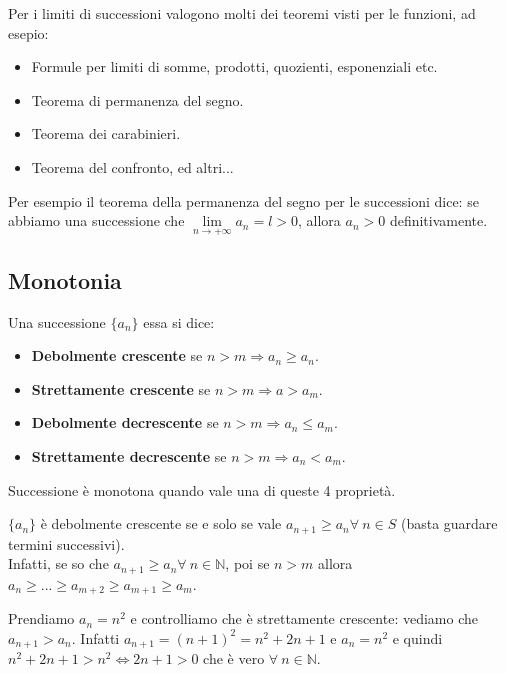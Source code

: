\begin{observation}
Per i limiti di successioni valogono molti dei teoremi visti per le funzioni, ad esepio:
\begin{itemize}
    \item Formule per limiti di somme, prodotti, quozienti, esponenziali etc.
    \item Teorema di permanenza del segno.
    \item Teorema dei carabinieri.
    \item Teorema del confronto, ed altri...
\end{itemize}
\end{observation}

\begin{example}
Per esempio il teorema della permanenza del segno per le successioni dice: se abbiamo una successione che $\lim\limits_{n\to +\infty} a_n = l > 0$, allora $a_n > 0$ definitivamente.
\end{example}

\subsection{Monotonia}
\begin{definition}[Monotonia]
Una successione $\{a_n\}$ essa si dice:
\begin{itemize}
    \item \textbf{Debolmente crescente} se $n>m \Longrightarrow a_n \geq a_n$.
    \item \textbf{Strettamente crescente} se $n > m \Longrightarrow a > a_m$.
    \item \textbf{Debolmente decrescente} se $n > m \Longrightarrow a_n \leq a_m$.
    \item \textbf{Strettamente decrescente} se $n > m \Longrightarrow a_n < a_m$.
\end{itemize}
Successione è monotona quando vale una di queste 4 proprietà.
\end{definition}

\begin{observation}
$\{a_n\}$ è debolmente crescente se e solo se vale $a_{n+1} \geq a_n \forall \: n \in S$ (basta guardare termini successivi).\\
Infatti, se so che $a_{n+1} \geq a_n \forall \: n \in \mathbb{N}$, poi se $n > m$ allora $a_n \geq ... \geq a_{m+2} \geq a_{m+1} \geq a_{m}$.
\end{observation}

\begin{example}
Prendiamo $a_n=n^2$ e controlliamo che è strettamente crescente: vediamo che $a_{n+1} > a_n$. Infatti $a_{n+1} = (n+1)^2 = n^2 + 2n + 1$ e $a_n = n^2$ e quindi $n^2 + 2n + 1 > n^2 \Longleftrightarrow 2n+1 > 0$ che è vero $\forall \:n \in \mathbb{N}$.
\end{example}


